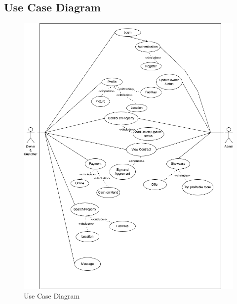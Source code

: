 \subsection{Use Case Diagram}
\begin{figure}[h]
    \centering
     \includegraphics[width=132mm]{Usercase.png}
    \caption{Use Case Diagram}
    \label{fig:Use Case Diagram}
\end{figure}

 \newpage
